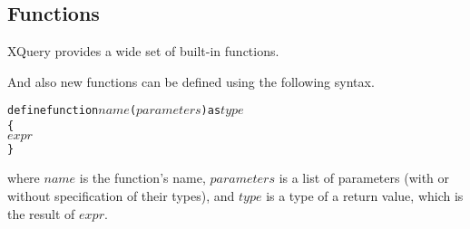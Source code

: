 \subsection{Functions}
XQuery provides a wide set of built-in functions.

And also new functions can be defined using the following syntax.
\begin{alltt}
define function \(name\)(\(parameters\)) as \(type\)
\{
  \(expr\)
\}
\end{alltt}
where $name$ is the function's name, $parameters$ is a list of parameters (with or without specification of their types), and $type$ is a type of a return value, which is the result of $expr$.






